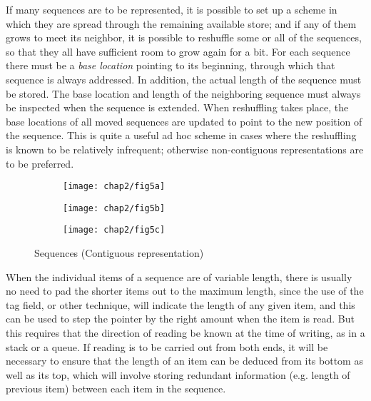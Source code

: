 If many sequences are to be represented, it is possible to set up a scheme in which they are spread through the remaining available store; and if any of them grows to meet its neighbor, it is possible to reshuffle some or all of the sequences, so that they all have sufficient room to grow again for a bit. For each sequence there must be a \textit{base location} pointing to its beginning, through which that sequence is always addressed. In addition, the actual length of the sequence must be stored. The base location and length of the neighboring sequence must always be inspected when the sequence is extended. When reshuffling takes place, the base locations of all moved sequences are updated to point to the new position of the sequence. This is quite a useful ad hoc scheme in cases where the reshuffling is known to be relatively infrequent; otherwise non-contiguous representations are to be preferred.

\begin{figure}[h]
	\centering
	\begin{subfigure}[b]{0.15\textwidth}
		\centering
		\texttt{[image: chap2/fig5a]}
		\caption{}
	\end{subfigure}	
	\begin{subfigure}[b]{0.3\textwidth}
		\centering
		\texttt{[image: chap2/fig5b]}
		\caption{}
	\end{subfigure}	
	\begin{subfigure}[b]{0.45\textwidth}
		\centering
		\texttt{[image: chap2/fig5c]}
		\caption{}
	\end{subfigure}	
	\caption{Sequences (Contiguous representation)}
\end{figure}

When the individual items of a sequence are of variable length, there is usually no need to pad the shorter items out to the maximum length, since the use of the tag field, or other technique, will indicate the length of any given item, and this can be used to step the pointer by the right amount when the item is read. But this requires that the direction of reading be known at the time of writing, as in a stack or a queue. If reading is to be carried out from both ends, it will be necessary to ensure that the length of an item can be deduced from its bottom as well as its top, which will involve storing redundant information (e.g. length of previous item) between each item in the sequence.

